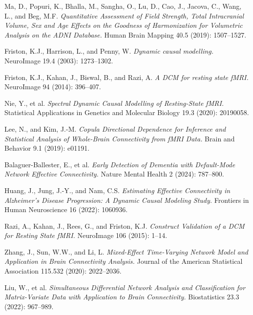 
Ma, D., Popuri, K., Bhalla, M., Sangha, O., Lu, D., Cao, J., Jacova, C., Wang, L., and Beg, M.F.
\textit{Quantitative Assessment of Field Strength, Total Intracranial Volume, Sex and Age Effects on the Goodness of Harmonization for Volumetric Analysis on the ADNI Database.}
Human Brain Mapping 40.5 (2019): 1507--1527.

Friston, K.J., Harrison, L., and Penny, W.
\textit{Dynamic causal modelling.}
NeuroImage 19.4 (2003): 1273--1302.

Friston, K.J., Kahan, J., Biswal, B., and Razi, A.
\textit{A DCM for resting state fMRI.}
NeuroImage 94 (2014): 396--407.

Nie, Y., et al.
\textit{Spectral Dynamic Causal Modelling of Resting-State fMRI.}
Statistical Applications in Genetics and Molecular Biology 19.3 (2020): 20190058.

Lee, N., and Kim, J.-M.
\textit{Copula Directional Dependence for Inference and Statistical Analysis of Whole-Brain Connectivity from fMRI Data.}
Brain and Behavior 9.1 (2019): e01191.

Balaguer-Ballester, E., et al.
\textit{Early Detection of Dementia with Default-Mode Network Effective Connectivity.}
Nature Mental Health 2 (2024): 787--800.

Huang, J., Jung, J.-Y., and Nam, C.S.
\textit{Estimating Effective Connectivity in Alzheimer's Disease Progression: A Dynamic Causal Modeling Study.}
Frontiers in Human Neuroscience 16 (2022): 1060936.

Razi, A., Kahan, J., Rees, G., and Friston, K.J.
\textit{Construct Validation of a DCM for Resting State fMRI.}
NeuroImage 106 (2015): 1--14.


Zhang, J., Sun, W.W., and Li, L.
\textit{Mixed-Effect Time-Varying Network Model and Application in Brain Connectivity Analysis.}
Journal of the American Statistical Association 115.532 (2020): 2022--2036.

Liu, W., et al.
\textit{Simultaneous Differential Network Analysis and Classification for Matrix-Variate Data with Application to Brain Connectivity.}
Biostatistics 23.3 (2022): 967--989.

